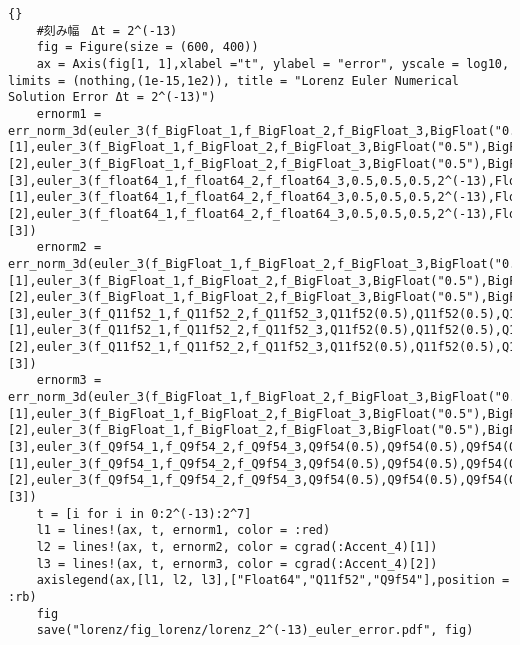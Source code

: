 \begin{lstlisting}[caption=\text{Lorenz\_example},label=code_lorenz]{}
    #刻み幅　Δt = 2^(-13)
    fig = Figure(size = (600, 400))
    ax = Axis(fig[1, 1],xlabel ="t", ylabel = "error", yscale = log10, limits = (nothing,(1e-15,1e2)), title = "Lorenz Euler Numerical Solution Error Δt = 2^(-13)")
    ernorm1 = err_norm_3d(euler_3(f_BigFloat_1,f_BigFloat_2,f_BigFloat_3,BigFloat("0.5"),BigFloat("0.5"),BigFloat("0.5"),BigFloat(2^(-13)),BigFloat,Int(2^20))[1],euler_3(f_BigFloat_1,f_BigFloat_2,f_BigFloat_3,BigFloat("0.5"),BigFloat("0.5"),BigFloat("0.5"),BigFloat(2^(-13)),BigFloat,Int(2^20))[2],euler_3(f_BigFloat_1,f_BigFloat_2,f_BigFloat_3,BigFloat("0.5"),BigFloat("0.5"),BigFloat("0.5"),BigFloat(2^(-13)),BigFloat,Int(2^20))[3],euler_3(f_float64_1,f_float64_2,f_float64_3,0.5,0.5,0.5,2^(-13),Float64,Int(2^20))[1],euler_3(f_float64_1,f_float64_2,f_float64_3,0.5,0.5,0.5,2^(-13),Float64,Int(2^20))[2],euler_3(f_float64_1,f_float64_2,f_float64_3,0.5,0.5,0.5,2^(-13),Float64,Int(2^20))[3])
    ernorm2 = err_norm_3d(euler_3(f_BigFloat_1,f_BigFloat_2,f_BigFloat_3,BigFloat("0.5"),BigFloat("0.5"),BigFloat("0.5"),BigFloat(2^(-13)),BigFloat,Int(2^20))[1],euler_3(f_BigFloat_1,f_BigFloat_2,f_BigFloat_3,BigFloat("0.5"),BigFloat("0.5"),BigFloat("0.5"),BigFloat(2^(-13)),BigFloat,Int(2^20))[2],euler_3(f_BigFloat_1,f_BigFloat_2,f_BigFloat_3,BigFloat("0.5"),BigFloat("0.5"),BigFloat("0.5"),BigFloat(2^(-13)),BigFloat,Int(2^20))[3],euler_3(f_Q11f52_1,f_Q11f52_2,f_Q11f52_3,Q11f52(0.5),Q11f52(0.5),Q11f52(0.5),2^(-13),Q11f52,Int(2^20))[1],euler_3(f_Q11f52_1,f_Q11f52_2,f_Q11f52_3,Q11f52(0.5),Q11f52(0.5),Q11f52(0.5),2^(-13),Q11f52,Int(2^20))[2],euler_3(f_Q11f52_1,f_Q11f52_2,f_Q11f52_3,Q11f52(0.5),Q11f52(0.5),Q11f52(0.5),2^(-13),Q11f52,Int(2^20))[3]) 
    ernorm3 = err_norm_3d(euler_3(f_BigFloat_1,f_BigFloat_2,f_BigFloat_3,BigFloat("0.5"),BigFloat("0.5"),BigFloat("0.5"),BigFloat(2^(-13)),BigFloat,Int(2^20))[1],euler_3(f_BigFloat_1,f_BigFloat_2,f_BigFloat_3,BigFloat("0.5"),BigFloat("0.5"),BigFloat("0.5"),BigFloat(2^(-13)),BigFloat,Int(2^20))[2],euler_3(f_BigFloat_1,f_BigFloat_2,f_BigFloat_3,BigFloat("0.5"),BigFloat("0.5"),BigFloat("0.5"),BigFloat(2^(-13)),BigFloat,Int(2^20))[3],euler_3(f_Q9f54_1,f_Q9f54_2,f_Q9f54_3,Q9f54(0.5),Q9f54(0.5),Q9f54(0.5),2^(-13),Q9f54,Int(2^20))[1],euler_3(f_Q9f54_1,f_Q9f54_2,f_Q9f54_3,Q9f54(0.5),Q9f54(0.5),Q9f54(0.5),2^(-13),Q9f54,Int(2^20))[2],euler_3(f_Q9f54_1,f_Q9f54_2,f_Q9f54_3,Q9f54(0.5),Q9f54(0.5),Q9f54(0.5),2^(-13),Q9f54,Int(2^20))[3])
    t = [i for i in 0:2^(-13):2^7]
    l1 = lines!(ax, t, ernorm1, color = :red)
    l2 = lines!(ax, t, ernorm2, color = cgrad(:Accent_4)[1])
    l3 = lines!(ax, t, ernorm3, color = cgrad(:Accent_4)[2])
    axislegend(ax,[l1, l2, l3],["Float64","Q11f52","Q9f54"],position = :rb)
    fig
    save("lorenz/fig_lorenz/lorenz_2^(-13)_euler_error.pdf", fig)   
\end{lstlisting}